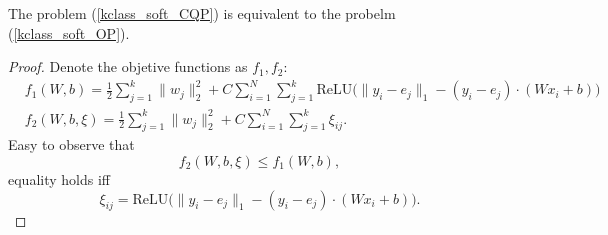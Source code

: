 \begin{lemma}
The problem (\ref{kclass_soft_CQP}) is equivalent to the probelm (\ref{kclass_soft_OP}).
\end{lemma}
\begin{proof}
Denote the objetive functions as $f_1,f_2$:
\begin{equation}
\begin{split}
&f_1(W,b) = \frac{1}{2}\displaystyle\sum_{j=1}^k \|w_j\|_2^2 + C\displaystyle\sum_{i=1}^N\displaystyle\sum_{j=1}^k\text{ReLU}\Big(\|y_i - e_j\|_1 - (y_i - e_j)\cdot (Wx_i+b)\Big)\\
&f_2(W,b,\xi) = \frac{1}{2}\displaystyle\sum_{j=1}^k \|w_j\|_2^2+C\displaystyle\sum_{i=1}^N\displaystyle\sum_{j=1}^k \xi_{ij}.
\end{split}
\end{equation}
Easy to observe that 
\begin{equation}
	f_2(W,b,\xi)\leq f_1(W,b),
\end{equation}
equality holds iff 
\begin{equation}
    \xi_{ij} = \text{ReLU}\Big(\|y_i - e_j\|_1 - (y_i - e_j)\cdot (Wx_i+b)\Big).
\end{equation}
\end{proof}


